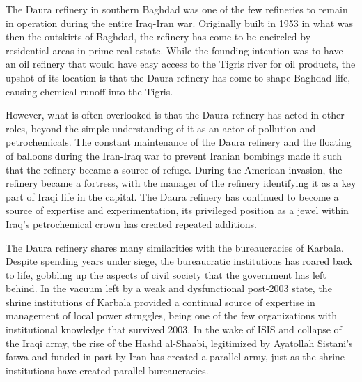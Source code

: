     





The Daura refinery in southern Baghdad was one of the few refineries to remain in operation during the entire Iraq-Iran war. Originally built in 1953 in what was then the outskirts of Baghdad, the refinery has come to be encircled by residential areas in prime real estate. While the founding intention was to have an oil refinery that would have easy access to the Tigris river for oil products, the upshot of its location is that the Daura refinery has come to shape Baghdad life, causing chemical runoff into the Tigris. 

However, what is often overlooked is that the Daura refinery has acted in other roles, beyond the simple understanding of it as an actor of pollution and petrochemicals. The constant maintenance of the Daura refinery and the floating of balloons during the Iran-Iraq war to prevent Iranian bombings made it such that the refinery became a source of refuge. During the American invasion, the refinery became a fortress, with the manager of the refinery identifying it as a key part of Iraqi life in the capital. The Daura refinery has continued to become a source of expertise and experimentation, its privileged position as a jewel within Iraq's petrochemical crown has created repeated additions. 

The Daura refinery shares many similarities with the bureaucracies of Karbala. Despite spending years under siege, the bureaucratic institutions has roared back to life, gobbling up the aspects of civil society that the government has left behind. In the vacuum left by a weak and dysfunctional post-2003 state, the shrine institutions of Karbala provided a continual source of expertise in management of local power struggles, being one of the few organizations with institutional knowledge that survived 2003. In the wake of ISIS and collapse of the Iraqi army, the rise of the Hashd al-Shaabi, legitimized by Ayatollah Sistani's fatwa and funded in part by Iran has created a parallel army, just as the shrine institutions have created parallel bureaucracies. 

